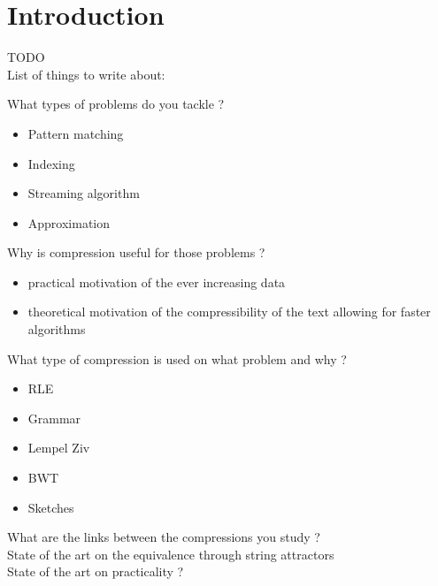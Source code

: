 \chapter*{Introduction}

TODO\\
List of things to write about:

What types of problems do you tackle ?
\begin{itemize}
\item Pattern matching
\item Indexing
\item Streaming algorithm
\item Approximation 
\end{itemize}


Why is compression useful for those problems ? 
\begin{itemize}
\item practical motivation of the ever increasing data
\item theoretical motivation of the compressibility of the text allowing for faster algorithms
\end{itemize}

What type of compression is used on what problem and why ?
\begin{itemize}
\item RLE
\item Grammar
\item Lempel Ziv
\item BWT
\item Sketches
\end{itemize}


What are the links between the compressions you study ?\\
State of the art on the equivalence through string attractors\\
State of the art on practicality ?



